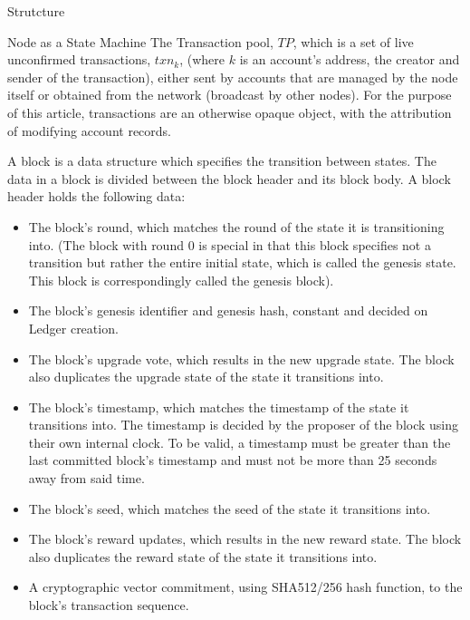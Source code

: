 \documentclass[10pt,a4paper]{article}
\begin{document}
\begin{section}{Strutcture}
\begin{subsection}{Node as a State Machine}
The Transaction pool, $TP$, which is a set of live unconfirmed transactions, $txn_k$, (where 
$k$ is an account's address, the creator and sender of the transaction), either
sent by accounts that are managed by the node itself or obtained from the network 
(broadcast by other nodes).
For the purpose of this article, transactions are an otherwise opaque object, with the 
attribution of modifying account records.

A {\sf block} is a data structure which specifies the transition between states.
The data in a block is divided between the block header and its block body.
A block header holds the following data:
\begin{itemize}
    \item
    The block's round, which matches the round of the state it is transitioning
    into. (The block with round 0 is special in that this block specifies not
    a transition but rather the entire initial state, which is called the genesis
    state. This block is correspondingly called the genesis block).
    
    \item
    The block's genesis identifier and genesis hash, constant and decided on
    Ledger creation.
    
    \item
    The block's upgrade vote, which results in the new upgrade state. The
    block also duplicates the upgrade state of the state it transitions into.
    
    \item
    The block's timestamp, which matches the timestamp of the state it transitions into. 
    The timestamp is decided by the proposer of the block using their own internal clock. 
    To be valid, a timestamp must be greater than the last committed block's timestamp 
    and must not be more than 25 seconds away from said time.
    
    \item
    The block's seed, which matches the seed of the state it transitions into.
    
    \item
    The block's reward updates, which results in the new reward state. The
    block also duplicates the reward state of the state it transitions into.
    
    \item
    A cryptographic vector commitment, using SHA512/256 hash function,
    to the block's transaction sequence.
    

\end{itemize}
\end{subsection}
\end{section}
\end{document}
